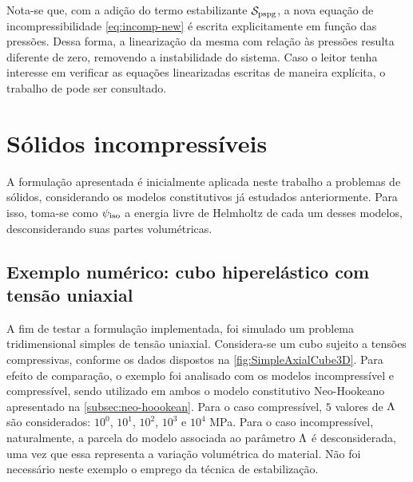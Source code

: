\documentclass[Tese.tex]{subfiles}
\begin{document}
Nota-se que, com a adição do termo estabilizante $\mathcal{S}_\text{pspg}$, a nova equação de incompressibilidade \eqref{eq:incomp-new} é escrita explicitamente em função das pressões. Dessa forma, a linearização da mesma com relação às pressões resulta diferente de zero, removendo a instabilidade do sistema. Caso o leitor tenha interesse em verificar as equações linearizadas escritas de maneira explícita, o trabalho de  pode ser consultado.

\section{Sólidos incompressíveis}\label{sec:incompressivelSolido}

A formulação apresentada é inicialmente aplicada neste trabalho a problemas de sólidos, considerando os modelos constitutivos já estudados anteriormente. Para isso, toma-se como $\psi_\text{iso}$ a energia livre de Helmholtz de cada um desses modelos, desconsiderando suas partes volumétricas.

\subsection{Exemplo numérico: cubo hiperelástico com tensão uniaxial}

A fim de testar a formulação implementada, foi simulado um problema tridimensional simples de tensão uniaxial. Considera-se um cubo sujeito a tensões compressivas, conforme os dados dispostos na \autoref{fig:SimpleAxialCube3D}. Para efeito de comparação, o exemplo foi analisado com os modelos incompressível e compressível, sendo utilizado em ambos o modelo constitutivo Neo-Hookeano apresentado na \autoref{subsec:neo-hoookean}. Para o caso compressível, $5$ valores de $\Lambda$ são considerados: $10^0$, $10^1$, $10^2$, $10^3$ e $10^4$ MPa. Para o caso incompressível, naturalmente, a parcela do modelo associada ao parâmetro $\Lambda$ é desconsiderada, uma vez que essa representa a variação volumétrica do material. Não foi necessário neste exemplo o emprego da técnica de estabilização.
\end{document}
